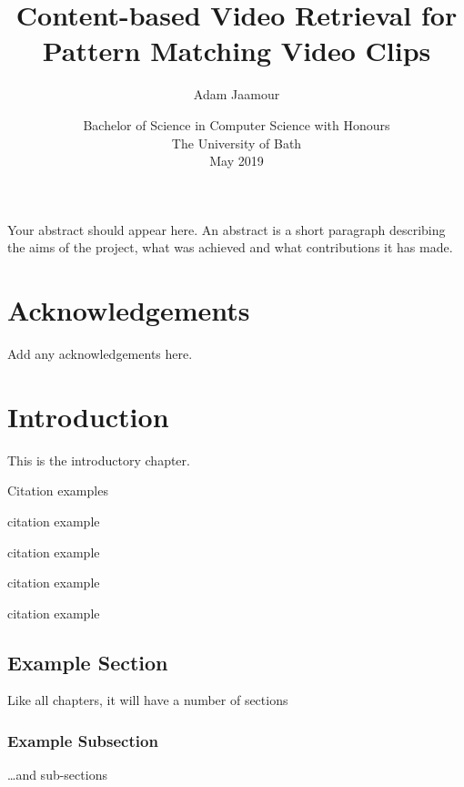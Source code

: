 \documentclass[11pt,openright,twoside,a4paper]{report}
\title{Content-based Video Retrieval for Pattern Matching Video Clips}
\author{Adam Jaamour}
\date{Bachelor of Science in Computer Science with Honours\\The University of Bath\\May 2019}
\begin{document}
\lstset{language=Python,breaklines,breakatwhitespace,basicstyle=\small}


\setcounter{page}{0}


\maketitle
\newpage


\newpage


\newpage


\abstract
Your abstract should appear here.  An abstract is a short
paragraph describing the aims of the project, what was
achieved and what contributions it has made.
\newpage


\tableofcontents
\newpage
\listoffigures
\newpage
\listoftables
\newpage


\chapter*{Acknowledgements}
Add any acknowledgements here.
\newpage


\setcounter{page}{1}



\chapter{Introduction}
%

This is the introductory chapter.

Citation examples

citation example \cite{2012-Patel-Meshram}

citation example \cite{2000-Petkovic}

citation example \cite{2015-Kalenzaga}

citation example \cite{2008-Bradski-Kaehler}

\section{Example Section}
Like all chapters, it will have a number of sections

\subsection{Example Subsection}
\ldots and sub-sections
\end{document}

